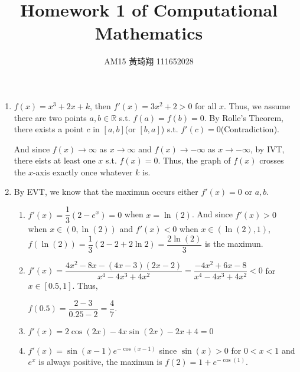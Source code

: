 \documentclass[12pt]{article}
\title{Homework 1 of Computational Mathematics}
\author{AM15 黃琦翔 111652028}
\begin{document}
\maketitle
\begin{enumerate}
    \item $f(x) = x^3 + 2x + k$, then $f'(x) = 3x^2 + 2 > 0$ for all $x$.
    Thus, we assume there are two points $a, b \in \mathbb{R}$ s.t. $f(a) = f(b) = 0$.
    By Rolle's Theorem, there exists a point $c$ in $[a, b]$(or $[b, a]$) s.t. $f'(c) = 0$(Contradiction).

    And since $f(x) \to \infty$ as $x \to \infty$ and $f(x) \to -\infty$ as $x\to -\infty$,
    by IVT, there eists at least one $x$ s.t. $f(x) = 0$.
    Thus, the graph of $f(x)$ crosses the $x$-axis exactly once whatever $k$ is.

    \item By EVT, we know that the maximun occurs either $f'(x) = 0$ or $a, b$.\begin{enumerate}
        \item $f'(x) = \dfrac{1}{3}(2 - e^{x}) = 0$ when $x = \ln(2)$.
        And since $f'(x) > 0$ when $x \in (0, \ln(2))$ and $f'(x) < 0$ when $x\in (\ln(2), 1)$,
        $f(\ln(2)) = \dfrac{1}{3}(2-2+2\ln2) = \dfrac{2\ln(2)}{3}$ is the maximun.

        \item $f'(x) = \dfrac{4x^2 - 8x - (4x-3)(2x-2)}{x^4 - 4x^3 + 4x^2} = \dfrac{-4x^2 + 6x - 8}{x^4 - 4x^3 + 4x^2} < 0$ for $x \in [0.5, 1]$.
        Thus, 
        
        $f(0.5) = \dfrac{2-3}{0.25-2} = \dfrac{4}{7}$.

        \item $f'(x) = 2\cos(2x) - 4x\sin(2x) - 2x + 4 = 0$

        \item $f'(x) = \sin(x-1)e^{-\cos(x-1)}$ since $\sin(x) > 0$ for $0 < x < 1$ and $e^{x}$ is always positive, 
        the maximun is $f(2) = 1 + e^{-\cos(1)}$.
    \end{enumerate}


\end{enumerate}
\end{document}
